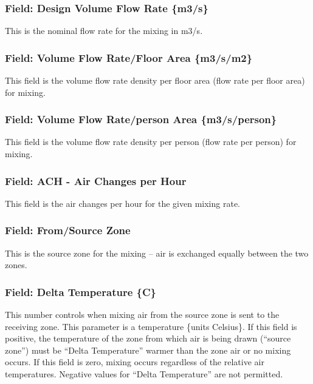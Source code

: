 \subsubsection{Field: Design Volume Flow Rate \{m3/s\}}\label{field-design-volume-flow-rate-m3s-3}

This is the nominal flow rate for the mixing in m3/s.

\subsubsection{Field: Volume Flow Rate/Floor Area \{m3/s/m2\}}\label{field-volume-flow-ratefloor-area-m3sm2-3}

This field is the volume flow rate density per floor area (flow rate per floor area) for mixing.

\subsubsection{Field: Volume Flow Rate/person Area \{m3/s/person\}}\label{field-volume-flow-rateperson-area-m3sperson-2}

This field is the volume flow rate density per person (flow rate per person) for mixing.

\subsubsection{Field: ACH - Air Changes per Hour}\label{field-ach---air-changes-per-hour-3}

This field is the air changes per hour for the given mixing rate.

\subsubsection{Field: From/Source Zone}\label{field-fromsource-zone-1}

This is the source zone for the mixing -- air is exchanged equally between the two zones.

\subsubsection{Field: Delta Temperature \{C\}}\label{field-delta-temperature-c-1}

This number controls when mixing air from the source zone is sent to the receiving zone. This parameter is a temperature \{units Celsius\}. If this field is positive, the temperature of the zone from which air is being drawn (``source zone'') must be ``Delta Temperature'' warmer than the zone air or no mixing occurs. If this field is zero, mixing occurs regardless of the relative air temperatures. Negative values for ``Delta Temperature'' are not permitted.

